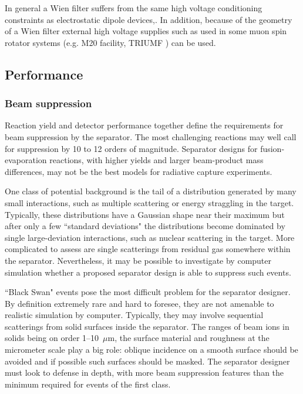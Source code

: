 In general a Wien filter suffers from the same high voltage conditioning constraints as electrostatic dipole devices,. In addition, because of the geometry of a Wien filter external high voltage supplies such as used in some muon spin rotator systems (e.g. M20 facility, TRIUMF \cite{bev85}) can be used. 

\subsection{Performance}
\label{performance}

\subsubsection{Beam suppression}
Reaction yield and detector performance together define the requirements for beam suppression by the separator.    The most challenging reactions  may well call for suppression by 10 to 12 orders of magnitude.    Separator designs for fusion-evaporation reactions, with higher yields and larger beam-product mass differences, may not be the best models  for radiative capture experiments.   
    
 One class of potential background is the tail of a  distribution generated by many small interactions, such as multiple scattering or energy straggling in the target.    Typically, these distributions have a Gaussian shape near their maximum but after only a few  ``standard deviations" the distributions become dominated by single large-deviation interactions, such as nuclear scattering in the target.    More complicated to assess are single scatterings from residual gas somewhere within the separator.   Nevertheless, it may be possible to investigate by computer simulation whether  a proposed separator design is able to suppress such events.
 
  ``Black Swan" events pose the most difficult problem for the separator designer.   By definition extremely rare and hard to foresee,  they are not  amenable to realistic simulation by computer.   Typically, they may involve sequential scatterings from  solid surfaces inside the separator.   The ranges of beam ions in solids being on order 1--10~$\mu$m, the surface material and roughness at the micrometer scale play a big role: oblique incidence on a smooth surface should be avoided and if possible such surfaces should be masked.   The separator designer must look to defense in depth, with more beam suppression features than the minimum required for events of the first  class.

